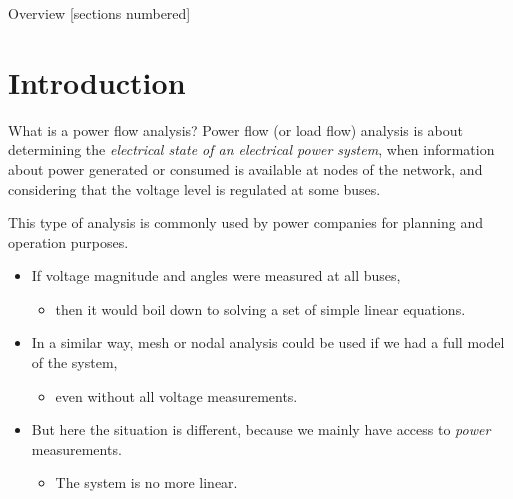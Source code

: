 \titleframe

\begin{frame}{Overview}
  [sections numbered]
  \tableofcontents[hideallsubsections]
\end{frame}

\section{Introduction}

\begin{frame}[allowframebreaks]{What is a power flow analysis?}
    Power flow (or load flow) analysis is about determining the \textit{electrical state of an electrical power system}, when information about power generated or consumed is available at nodes of the network, and considering that the voltage level is regulated at some buses.
    
    This type of analysis is commonly used by power companies for planning and operation purposes.
    \begin{itemize}
        \item If voltage magnitude and angles were measured at all buses,
        \begin{itemize}
            \item then it would boil down to solving a set of simple linear equations.
        \end{itemize}
        \item In a similar way, mesh or nodal analysis could be used if we had a full model of the system,
        \begin{itemize}
            \item even without all voltage measurements.
        \end{itemize}
        \item But here the situation is different, because we mainly have access to \textit{power} measurements.
        \begin{itemize}
            \item The system is no more linear.
        \end{itemize}
    \end{itemize}
\end{frame}

